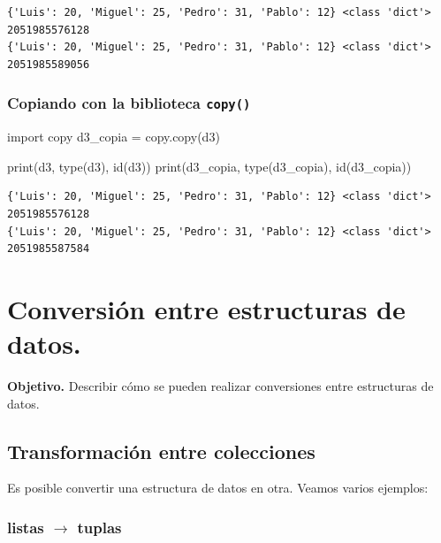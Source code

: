 \documentclass[
  spanish,
  letterpaper,
]{scrbook}
\newenvironment{Shaded}{\begin{snugshade}}{\end{snugshade}}
\newcommand{\BuiltInTok}[1]{\textcolor[rgb]{0.00,0.23,0.31}{#1}}
\newcommand{\ImportTok}[1]{\textcolor[rgb]{0.00,0.46,0.62}{#1}}
\newcommand{\NormalTok}[1]{\textcolor[rgb]{0.00,0.23,0.31}{#1}}
\newcommand{\OperatorTok}[1]{\textcolor[rgb]{0.37,0.37,0.37}{#1}}
\theoremstyle{definition}
\theoremstyle{remark}
\begin{document}
\begin{verbatim}
{'Luis': 20, 'Miguel': 25, 'Pedro': 31, 'Pablo': 12} <class 'dict'> 2051985576128
{'Luis': 20, 'Miguel': 25, 'Pedro': 31, 'Pablo': 12} <class 'dict'> 2051985589056
\end{verbatim}

\subsection{\texorpdfstring{Copiando con la biblioteca
\texttt{copy()}}{Copiando con la biblioteca copy()}}\label{copiando-con-la-biblioteca-copy-2}

\begin{Shaded}
\begin{Highlighting}[]
\ImportTok{import}\NormalTok{ copy}
\NormalTok{d3\_copia }\OperatorTok{=}\NormalTok{ copy.copy(d3)}

\BuiltInTok{print}\NormalTok{(d3, }\BuiltInTok{type}\NormalTok{(d3), }\BuiltInTok{id}\NormalTok{(d3))}
\BuiltInTok{print}\NormalTok{(d3\_copia, }\BuiltInTok{type}\NormalTok{(d3\_copia), }\BuiltInTok{id}\NormalTok{(d3\_copia))}
\end{Highlighting}
\end{Shaded}

\begin{verbatim}
{'Luis': 20, 'Miguel': 25, 'Pedro': 31, 'Pablo': 12} <class 'dict'> 2051985576128
{'Luis': 20, 'Miguel': 25, 'Pedro': 31, 'Pablo': 12} <class 'dict'> 2051985587584
\end{verbatim}

\chapter{Conversión entre estructuras de datos.}\label{sec-m-conversion}

\textbf{Objetivo.} Describir cómo se pueden realizar conversiones entre
estructuras de datos.

\section{Transformación entre
colecciones}\label{transformaciuxf3n-entre-colecciones}

Es posible convertir una estructura de datos en otra. Veamos varios
ejemplos:

\subsection{\texorpdfstring{listas \(\to\)
tuplas}{listas \textbackslash to tuplas}}\label{listas-to-tuplas}
\end{document}
